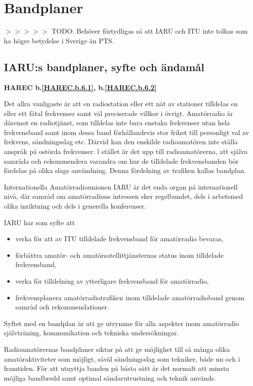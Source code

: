 \section{Bandplaner}

$>>>>>$ TODO: Behöver förtydligas så att IARU och ITU inte tolkas som ha högre betydelse i Sverige än PTS.

\subsection{IARU:s bandplaner, syfte och ändamål}
\textbf{
HAREC b.\ref{HAREC.b.6.1}\label{myHAREC.b.6.1},
 b.\ref{HAREC.b.6.2}\label{myHAREC.b.6.2}
}

Det allra vanligaste är att en radiostation eller ett nät av stationer tilldelas
en eller ett fåtal frekvenser samt väl preciserade villkor i övrigt. Amatörradio
är däremot en radiotjänst, som tilldelas inte bara enstaka frekvenser utan hela
frekvensband samt inom dessa band förhållandevis stor frihet till personligt val
av frekvens, sändningsslag etc.  Därvid kan den enskilde radioamatören inte
ställa anspråk på ostörda frekvenser. l stället är det upp till radioamatörerna,
att själva samråda och rekommendera varandra om hur de tilldelade frekvensbanden
bör fördelas på olika slags användning. Denna fördelning av trafiken kallas
bandplan.

Internationella Amatörradiounionen IARU är det enda organ på internationell
nivå, där samråd om amatörradions intressen sker regelbundet, dels i arbetsmed
olika inriktning och dels i generella konferenser.

IARU har som syfte att

\begin{itemize}
\item verka för att av ITU tilldelade frekvensband för amatörradio bevaras,
\item förbättra amatör- och amatörsatellittjänsternas status inom tilldelade
  frekvensband,
\item verka för tilldelning av ytterligare frekvensband för amatörradio,
\item frekvensplanera amatörradiotrafiken inom tilldelade amatörradioband genom
  samråd och rekommendationer.
\end{itemize}

Syftet med en bandplan är att ge utrymme för alla aspekter inom amatörradio
självträning, kommunikation och tekniska undersökningar.

Radioamatörernas bandplaner siktar på att ge möjlighet till så många olika
amatöraktiviteter som möjligt, såväl sändningsslag som tekniker, både nu och i
framtiden. För att utnyttja banden på bästa sätt är det normalt att minsta
möjliga bandbredd samt optimal sändarutrustning och teknik används.

